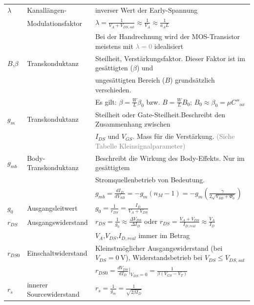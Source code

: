 \begin{tabular}{|p{}|p{}|p{}|}
	$\lambda$&Kanallängen-&inverser Wert der Early-Spannung\\
	&Modulationsfaktor&$\lambda = \frac{1}{V_A + V_{DS,sat}} \approx \frac{1}{V_A} \approx \frac{1}{a_AL}$\\	
	&&Bei der Handrechnung wird der MOS-Transistor meistens mit \textcolor{gray}{$\lambda = 0$} idealisiert\\ \hline
	$B$,$\beta$&Transkonduktanz&Steilheit, Verstärkungsfaktor. Dieser Faktor ist im gesättigten ($\beta$) und\\
	&&ungesättigten Bereich ($B$) grundsätzlich verschieden.\\
	&&Es gilt: $\beta=\frac{W}{L}\beta_0$ bzw. $B=\frac{W}{L}B_0$; $B_0\approx \beta_0 = \mu C''_{ox}$ \\ \hline
	$g_m$&Transkonduktanz&Steilheit oder Gate-Steilheit.Beschreibt den Zusammenhang zwischen\\
	&&$I_{DS}$ und $V_{GS}$. Mass für die Verstärkung. \textcolor{gray}{(Siehe Tabelle Kleinsignalparameter)}\\ \hline
	$g_{mb}$&Body-Transkonduktanz&Beschreibt die Wirkung des Body-Effekts. Nur im gesättigtem\\
	&&Stromquellenbetrieb von Bedeutung.\\ 
	&&$g_{mb}=\frac{dI_D}{dV_{SB}}=-g_m(n_M-1)=-g_m(\frac{\gamma}{2\sqrt{V_{SB}+\Phi_0}})$\\ \hline
	$g_0$&Ausgangsleitwert&$g_0=\frac{1}{r_{DS}}=\frac{I_D}{V_A+V_{DS}}$\\ \hline
	$r_{DS}$&Ausgangswiderstand&$r_{DS}=\frac{1}{g_0}\approx\frac{\Delta V_{DS}}{\Delta I_D}$ oder $r_{DS}=\frac{V_A+V_{DS}}{I_{D,real}}\approx\frac{V_A}{I_D}$\\
	&&$V_A$,$V_{DS}$,$I_{D,real}$ immer im Betrag\\ \hline
	$r_{DS0}$&Einschaltwiderstand&Kleinstmöglicher Ausgangswiderstand (bei $V_{DS}=\SI{0}{\volt}$), Widerstandsbetrieb bei $V_{DS}\leq V_{DS,sat}$\\
	&&$r_{DS0}=\frac{dV_{DS}}{dI_D}\vert_{V_{DS}=0} = \frac{1}{\beta(V_{GS}-V_T)}$\\ \hline
	$r_s$&innerer Sourcewiderstand&$r_s=\frac{1}{g_m}=\frac{1}{\sqrt{2\beta I_D}}$\\ 
	\hline
\end{tabular}

